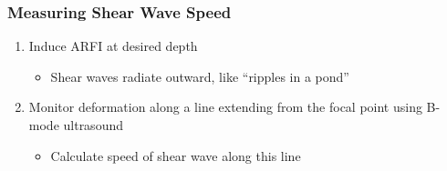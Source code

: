 \documentclass{beamer}
\begin{document}
		\begin{frame}
			\frametitle{Measuring Shear Wave Speed}
			\vspace{1cm}
			\begin{enumerate}
				\item<1-> Induce ARFI at desired depth
				\begin{itemize}
					\item Shear waves radiate outward, like ``ripples in a pond''
				\end{itemize}
				\item<2-> Monitor deformation along a line extending from the focal point using B-mode ultrasound
				\begin{itemize}
					\item<3-> Calculate speed of shear wave along this line
				\end{itemize}
			\end{enumerate}


\end{frame}
\end{document}
